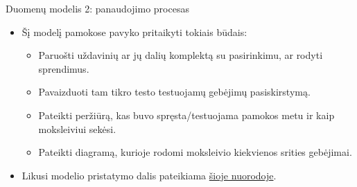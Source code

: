 \documentclass[xcolor={dvipsnames}]{beamer}
\begin{document}
\begin{frame}[fragile]{Duomenų modelis 2: panaudojimo procesas}
\begin{itemize}
\item <1-> Šį modelį pamokose pavyko pritaikyti tokiais būdais:
\begin{itemize}
\item<2->  Paruošti uždavinių ar jų dalių komplektą su pasirinkimu, ar rodyti sprendimus.
\item<3->  Pavaizduoti tam tikro testo testuojamų gebėjimų pasiskirstymą.
\item<4->  Pateikti peržiūrą, kas buvo spręsta/testuojama pamokos metu ir kaip moksleiviui sekėsi.
\item<5->  Pateikti diagramą, kurioje rodomi moksleivio kiekvienos srities gebėjimai. 
\end{itemize}
\item<6->  Likusi modelio pristatymo dalis pateikiama \href{https://github.com/loijord/matematikos\_pamokos/blob/master/programa/Mantas/stojamieji/pirmas\_testas/darbo\_planas.ipynb}{šioje nuorodoje}.
\end{itemize}
\end{frame}
\end{document}
